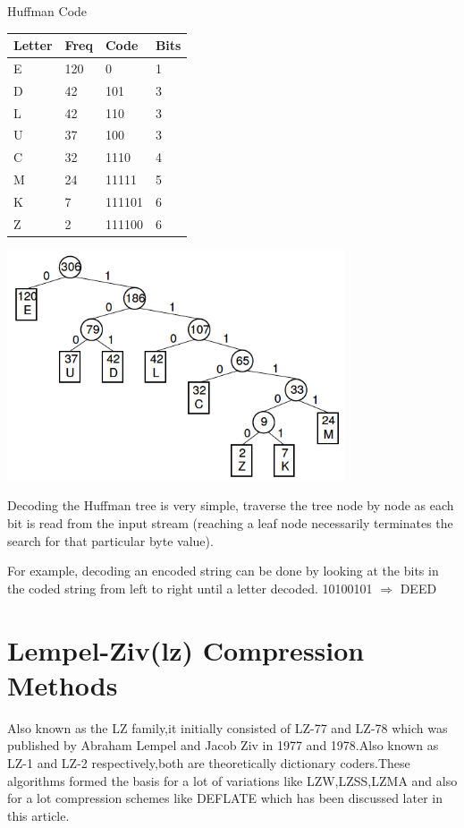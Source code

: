 \documentclass{article}
\begin{document}
Huffman Code\

\begin{flushleft}
	\setlength{\extrarowheight}{0.2cm}
	\begin{tabular}{|l|l|l|l|}
		\hline
		Letter & Freq & Code   & Bits \\ \hline
		E      & 120  & 0      & 1    \\ \hline
		D      & 42   & 101    & 3    \\ \hline
		L      & 42   & 110    & 3    \\ \hline
		U      & 37   & 100    & 3    \\ \hline
		C      & 32   & 1110   & 4    \\ \hline
		M      & 24   & 11111  & 5    \\ \hline
		K      & 7    & 111101 & 6    \\ \hline
		Z      & 2    & 111100 & 6    \\ \hline
	\end{tabular}
\end{flushleft}

\begin{center}
	\includegraphics[width=10cm]{huffman_tree}
\end{center}

Decoding the Huffman tree is very simple, traverse the tree node by node as each bit is read from the input stream (reaching a leaf node necessarily terminates the search for that particular byte value). 

For example, decoding an encoded string can be done by looking at the bits in the coded string from left to right until a letter decoded.
10100101 $\Rightarrow$ DEED

\section{Lempel-Ziv(lz) Compression Methods}
Also known as the LZ family,it initially consisted of LZ-77 and LZ-78 which was published by Abraham Lempel and Jacob Ziv in 1977\cite{ziv1977universal} and 1978\cite{ziv1978compression}.Also known as LZ-1 and LZ-2 respectively,both are theoretically dictionary coders.These algorithms formed the basis for a lot of variations like LZW,LZSS,LZMA and also for a lot compression schemes like DEFLATE which has been discussed later in this article.
\end{document}
